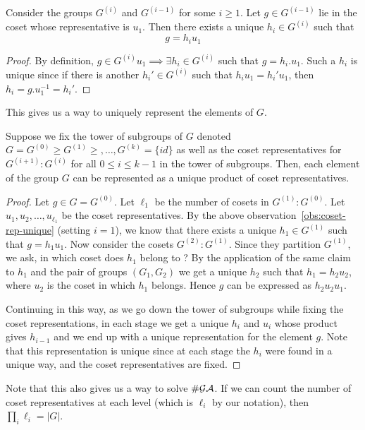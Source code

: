 \begin{observation}
	Consider the groups $G^{(i)}$ and $G^{(i-1)}$ for some $i \ge 1$. 
	Let $g \in G^{(i-1)}$ lie in the coset whose representative is $u_1$.
	Then there exists a unique $h_i \in G^{(i)}$ such that \[ g = h_iu_1\]
	\label{obs:coset-rep-unique}
\end{observation}
\begin{proof}
	By definition, $g \in G^{(i)}u_1 \implies \exists h_{i} \in G^{(i)}$
	such that $g = h_{i}.u_{1}$. Such a $h_{i}$ is unique since if there
	is another $h_i' \in G^{(i)}$ such that $h_{i}u_1 = h_i'u_1$, then $
	h_i = g.u_{1}^{-1} = h_{i}'$.
\end{proof}
This gives us a way to uniquely represent the elements of $G$.
\begin{theorem}
	Suppose we fix the tower of subgroups of $G$ denoted 
	$G = G^{(0)} \ge G^{(1)} \ge , \ldots, G^{(k)} = \{id\}$ as well as 
	the coset representatives for $G^{(i+1)}:G^{(i)}$ for all $0 \le i \le
	k-1$ in the tower of subgroups. Then, each element of the group $G$
	can be represented as a unique product of coset representatives.
	\label{th:tower-coset-repr}
\end{theorem}
\begin{proof}
	Let $g \in G = G^{(0)}$. Let $\ell_1$ be the number of cosets in
	$G^{(1)}:G^{(0)}$. Let $u_1, u_2, \ldots, u_{\ell_1}$ be the coset
	representatives. By the above
	observation~\ref{obs:coset-rep-unique} (setting $i=1$), we know that 
	there exists a unique $h_{1} \in G^{(1)}$ such that $g = h_1u_1$. Now
	consider the cosets $G^{(2)}:G^{(1)}$. Since they partition $G^{(1)}$, 
	we ask, in which coset does $h_{1}$ belong to ? By the application of 
	the same claim to $h_{1}$ and the pair of groups
	$(G_{1}, G_{2})$ we get a unique $h_{2}$ such that $h_{1} =
	h_{2}u_{2}$, where $u_2$ is the coset in which $h_{1}$ belongs. Hence
	$g$ can be expressed as $h_2u_2u_1$.  
	
	Continuing in this way, as we go
	down the tower of subgroups while fixing the coset representations, 
	in each stage we get a unique $h_i$ and $u_i$ whose product gives
	$h_{i-1}$ and we end up with a unique representation for the element
	$g$. Note that this representation is unique since at each stage the
	$h_{i}$ were found in a unique way, and the coset representatives are
	fixed.
\end{proof}
Note that this also gives us a way to solve $\# \mathcal{GA}$. If we can count the
number of coset representatives at each level (which is $\ell_i$ by our
notation), then $\prod_i \ell_i = |G|$.

